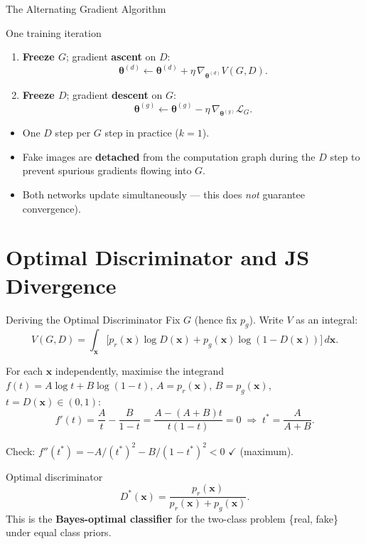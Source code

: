 \documentclass[aspectratio=169,11pt]{beamer}
\newcommand{\bx}{\bm{x}}
\newcommand{\btheta}{\bm{\theta}}
\newcommand{\pr}{p_{r}}           %
\newcommand{\pg}{p_{g}}           %
\begin{document}
\begin{frame}{The Alternating Gradient Algorithm}
  \begin{block}{One training iteration}
    \begin{enumerate}
      \setlength\itemsep{4pt}
      \item \textbf{Freeze $G$}; gradient \textbf{ascent} on $D$:
            \[
              \btheta^{(d)} \leftarrow \btheta^{(d)}
              + \eta\,\nabla_{\btheta^{(d)}}V(G,D).
            \]

      \item \textbf{Freeze $D$}; gradient \textbf{descent} on $G$:
            \[
              \btheta^{(g)} \leftarrow \btheta^{(g)}
              - \eta\,\nabla_{\btheta^{(g)}}\mathcal{L}_G.
            \]
    \end{enumerate}
  \end{block}

  \medskip
  \begin{itemize}
    \item One $D$ step per $G$ step in practice ($k=1$).
    \item Fake images are \textbf{detached} from the computation graph during
          the $D$ step to prevent spurious gradients flowing into $G$.
    \item Both networks update simultaneously — this does \emph{not} guarantee
          convergence).
  \end{itemize}
\end{frame}

\section{Optimal Discriminator and JS Divergence}

\begin{frame}{Deriving the Optimal Discriminator}
\small
  Fix $G$ (hence fix $\pg$). Write $V$ as an integral:
  \[
    V(G,D) = \int_{\bx}
    \bigl[\pr(\bx)\log D(\bx) + \pg(\bx)\log(1-D(\bx))\bigr]\,d\bx.
  \]

  \smallskip
  For each $\bx$ independently, maximise the integrand
  $f(t)=A\log t+B\log(1-t)$, $A=\pr(\bx)$, $B=\pg(\bx)$, $t=D(\bx)\in(0,1)$:
  \[
    f'(t) = \frac{A}{t} - \frac{B}{1-t}
    = \frac{A-(A+B)t}{t(1-t)} = 0
    \;\Longrightarrow\; t^* = \frac{A}{A+B}.
  \]

  Check: $f''(t^*) = -A/(t^*)^2 - B/(1-t^*)^2 < 0$ \; $\checkmark$ (maximum).

  \begin{block}{Optimal discriminator}
    \[
      \boxed{D^*(\bx) = \frac{\pr(\bx)}{\pr(\bx)+\pg(\bx)}.}
    \]
    This is the \textbf{Bayes-optimal classifier} for the two-class problem
    \{real, fake\} under equal class priors.
  \end{block}
\end{frame}
\end{document}
